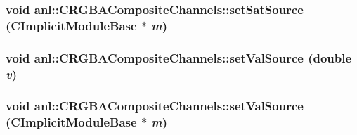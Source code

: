 \label{classanl_1_1CRGBACompositeChannels_ae9a1eb914934acff7c7c0d94ef700a96}
\hypertarget{classanl_1_1CRGBACompositeChannels_a1ce8876b3b0aad111db348de224a2b56}{
\subsubsection[{setSatSource}]{\setlength{\rightskip}{0pt plus 5cm}void anl::CRGBACompositeChannels::setSatSource ({\bf CImplicitModuleBase} $\ast$ {\em m})}}
\label{classanl_1_1CRGBACompositeChannels_a1ce8876b3b0aad111db348de224a2b56}
\hypertarget{classanl_1_1CRGBACompositeChannels_a3bdc942dc882f6bd5121b92b63412a29}{
\subsubsection[{setValSource}]{\setlength{\rightskip}{0pt plus 5cm}void anl::CRGBACompositeChannels::setValSource (double {\em v})}}
\label{classanl_1_1CRGBACompositeChannels_a3bdc942dc882f6bd5121b92b63412a29}
\hypertarget{classanl_1_1CRGBACompositeChannels_a304e1e3c22846fcd7ebd28eec30848fc}{
\subsubsection[{setValSource}]{\setlength{\rightskip}{0pt plus 5cm}void anl::CRGBACompositeChannels::setValSource ({\bf CImplicitModuleBase} $\ast$ {\em m})}}
\label{classanl_1_1CRGBACompositeChannels_a304e1e3c22846fcd7ebd28eec30848fc}


